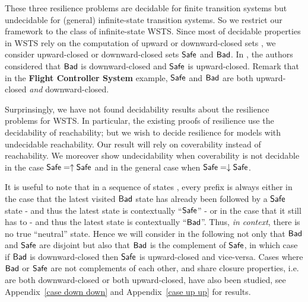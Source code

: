   
These three resilience problems are decidable for finite transition systems but undecidable for (general) infinite-state transition systems. So we restrict our framework to the class of infinite-state WSTS. Since most of decidable properties in WSTS rely on the computation of upward or downward-closed sets \cite{DBLP:journals/iandc/AbdullaCJT00, DBLP:journals/tcs/FinkelS01}, we consider upward-closed or downward-closed sets $\textsf{Safe}$ and $\textsf{Bad}$. In \cite{DBLP:journals/corr/abs-2108-00889}, the authors considered that $\textsf{Bad}$ is downward-closed and $\textsf{Safe}$ is upward-closed. %
Remark that in the {\bf Flight Controller System} example, $\textsf{Safe}$ and $\textsf{Bad}$ are both upward-closed \emph{and} downward-closed.

Surprinsingly, we have not found decidability results about the resilience problems for WSTS.	
In particular, the existing proofs of resilience use the decidability of reachability;
 but we wish to decide resilience for models with undecidable reachability.
Our result will rely on coverability instead of reachability. We moreover show undecidability when coverability is not decidable in the case $\textsf{Safe} = \uparrow \textsf{Safe}$
and in the general case when $\textsf{Safe} = \downarrow \textsf{Safe}$.
 





It is useful to note that in a sequence of states%
, every prefix is always 
either in the case that the latest visited $\textsf{Bad}$ state has already been followed by a 
$\textsf{Safe}$ state \-- and thus the latest state is contextually ``$\textsf{Safe}$'' \--
or in the case that it still has to \-- and thus the latest state is contextually ``$\textsf{Bad}$''. 
Thus, \emph{in context}, there is no true ``neutral'' state.
Hence we will consider in the following not only that $\textsf{Bad}$ and $\textsf{Safe}$ are disjoint but
	also
that $\textsf{Bad}$ is the complement of $\textsf{Safe}$,
in which case
if $\textsf{Bad}$ is downward-closed then $\textsf{Safe}$ is upward-closed and vice-versa.
Cases where $\textsf{Bad}$ or $\textsf{Safe}$ are not complements of each other, and share closure properties, i.e. are both downward-closed or both upward-closed,
have also been studied, 
see 
Appendix~\ref{case down down}
and
Appendix~\ref{case up up} for results.


